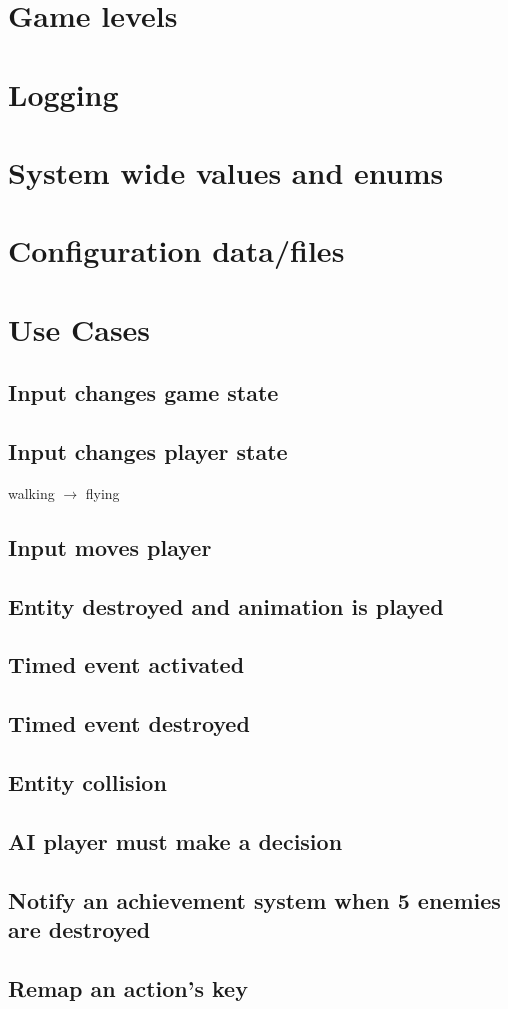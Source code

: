 \documentclass[12pt]{article}
\begin{document}
\section{	Game levels}

\section{	Logging}

\section{	System wide values and enums}

\section{	Configuration data/files}

\section{Use Cases}
\subsection{Input changes game state}
\subsection{Input changes player state}
walking $\rightarrow$ flying
\subsection{Input moves player}
\subsection{Entity destroyed and animation is played}
\subsection{Timed event activated}
\subsection{Timed event destroyed}
\subsection{Entity collision}
\subsection{AI player must make a decision}
\subsection{Notify an achievement system when 5 enemies are destroyed}
\subsection{Remap an action's key}
\end{document}
